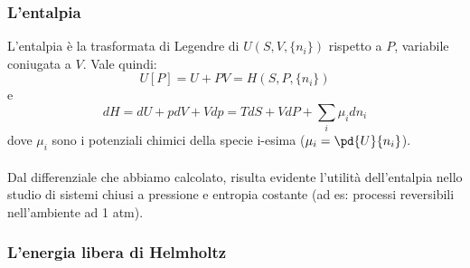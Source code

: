\documentclass{article}
\begin{document}
\subsubsection{L'entalpia}
L'entalpia è la trasformata di Legendre di $U(S,V,\{n_i\})$ rispetto a $P$, variabile coniugata a $V$. Vale quindi:
$$ U[P] = U+PV=H(S,P,\{n_i\}) $$
e
$$ dH = dU+pdV+Vdp=TdS+VdP+\sum_i\mu_idn_i $$
dove $\mu_i$ sono i potenziali chimici della specie i-esima ($\mu_i=\pd{U}{n_i}$).\\\\
Dal differenziale che abbiamo calcolato, risulta evidente l'utilità dell'entalpia nello studio di sistemi chiusi a pressione e entropia costante (ad es: processi reversibili nell'ambiente ad 1 atm).

\subsubsection{L'energia libera di Helmholtz}











\Index
\end{document}
